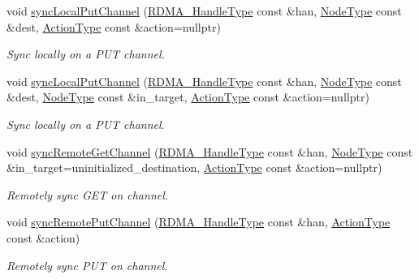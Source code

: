 \begin{DoxyCompactItemize}
void \hyperlink{structvt_1_1rdma_1_1_r_d_m_a_manager_ad09037e1408af7037ca87fc4708700aa}{sync\+Local\+Put\+Channel} (\hyperlink{namespacevt_a10442579ec4e7ebef223818e64bcf908}{R\+D\+M\+A\+\_\+\+Handle\+Type} const \&han, \hyperlink{namespacevt_a866da9d0efc19c0a1ce79e9e492f47e2}{Node\+Type} const \&dest, \hyperlink{namespacevt_ae0a5a7b18cc99d7b732cb4d44f46b0f3}{Action\+Type} const \&action=nullptr)
\begin{DoxyCompactList}\small\item\em Sync locally on a P\+UT channel. \end{DoxyCompactList}\item 
void \hyperlink{structvt_1_1rdma_1_1_r_d_m_a_manager_a3b4e56f84f35786f8225baffeaa921ea}{sync\+Local\+Put\+Channel} (\hyperlink{namespacevt_a10442579ec4e7ebef223818e64bcf908}{R\+D\+M\+A\+\_\+\+Handle\+Type} const \&han, \hyperlink{namespacevt_a866da9d0efc19c0a1ce79e9e492f47e2}{Node\+Type} const \&dest, \hyperlink{namespacevt_a866da9d0efc19c0a1ce79e9e492f47e2}{Node\+Type} const \&in\+\_\+target, \hyperlink{namespacevt_ae0a5a7b18cc99d7b732cb4d44f46b0f3}{Action\+Type} const \&action=nullptr)
\begin{DoxyCompactList}\small\item\em Sync locally on a P\+UT channel. \end{DoxyCompactList}\item 
void \hyperlink{structvt_1_1rdma_1_1_r_d_m_a_manager_afaa2ab82b754c4a231c3d728fe0a9e88}{sync\+Remote\+Get\+Channel} (\hyperlink{namespacevt_a10442579ec4e7ebef223818e64bcf908}{R\+D\+M\+A\+\_\+\+Handle\+Type} const \&han, \hyperlink{namespacevt_a866da9d0efc19c0a1ce79e9e492f47e2}{Node\+Type} const \&in\+\_\+target=uninitialized\+\_\+destination, \hyperlink{namespacevt_ae0a5a7b18cc99d7b732cb4d44f46b0f3}{Action\+Type} const \&action=nullptr)
\begin{DoxyCompactList}\small\item\em Remotely sync G\+ET on channel. \end{DoxyCompactList}\item 
void \hyperlink{structvt_1_1rdma_1_1_r_d_m_a_manager_a9b6fb7fac7c6b534659705cf4ad20658}{sync\+Remote\+Put\+Channel} (\hyperlink{namespacevt_a10442579ec4e7ebef223818e64bcf908}{R\+D\+M\+A\+\_\+\+Handle\+Type} const \&han, \hyperlink{namespacevt_ae0a5a7b18cc99d7b732cb4d44f46b0f3}{Action\+Type} const \&action)
\begin{DoxyCompactList}\small\item\em Remotely sync P\+UT on channel. \end{DoxyCompactList}\item 

\end{DoxyCompactItemize}
